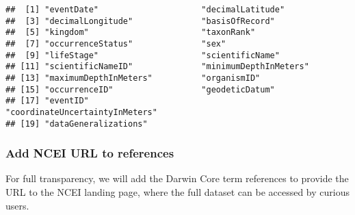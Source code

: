 \documentclass[
]{book}
\newenvironment{Shaded}{\begin{snugshade}}{\end{snugshade}}
\newcommand{\NormalTok}[1]{#1}
\newcommand{\OtherTok}[1]{\textcolor[rgb]{0.56,0.35,0.01}{#1}}
\newcommand{\SpecialCharTok}[1]{\textcolor[rgb]{0.00,0.00,0.00}{#1}}
\newcommand{\StringTok}[1]{\textcolor[rgb]{0.31,0.60,0.02}{#1}}
\begin{document}
\begin{verbatim}
##  [1] "eventDate"                     "decimalLatitude"              
##  [3] "decimalLongitude"              "basisOfRecord"                
##  [5] "kingdom"                       "taxonRank"                    
##  [7] "occurrenceStatus"              "sex"                          
##  [9] "lifeStage"                     "scientificName"               
## [11] "scientificNameID"              "minimumDepthInMeters"         
## [13] "maximumDepthInMeters"          "organismID"                   
## [15] "occurrenceID"                  "geodeticDatum"                
## [17] "eventID"                       "coordinateUncertaintyInMeters"
## [19] "dataGeneralizations"
\end{verbatim}

\hypertarget{add-ncei-url-to-references}{%
\subsubsection{Add NCEI URL to references}\label{add-ncei-url-to-references}}

For full transparency, we will add the Darwin Core term references to provide the URL to the NCEI landing page, where the full dataset can be accessed by curious users.

\begin{Shaded}
\end{Shaded}
\end{document}
